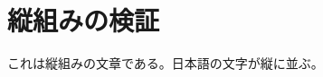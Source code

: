 \documentclass[tate]{jlreq}
\begin{document}
\section{縦組みの検証}
これは縦組みの文章である。日本語の文字が縦に並ぶ。
\end{document}
